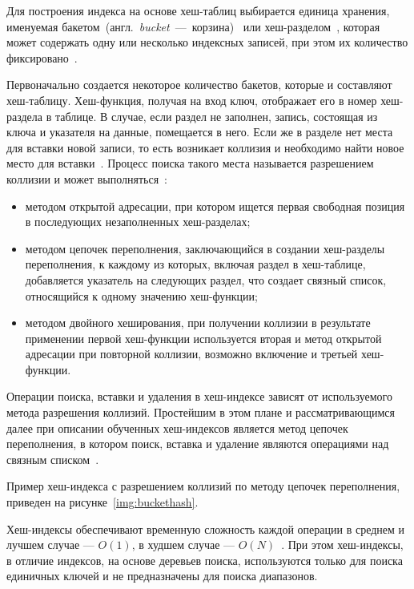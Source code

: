 Для построения индекса на основе хеш-таблиц выбирается единица хранения,
именуемая
\mbox{бакетом}~(англ.~\textit{bucket}~---~\mbox{корзина})~\cite{marvel} или
\mbox{хеш-разделом}~\cite{amur}, которая может содержать одну или несколько
индексных записей, при этом их количество фиксировано~\cite{ship}.

Первоначально создается некоторое количество бакетов, которые и составляют
хеш-таблицу. Хеш-функция, получая на вход ключ, отображает его в номер
хеш-раздела в таблице. В случае, если раздел не заполнен, запись, состоящая из
ключа и указателя на данные, помещается в него. Если же в разделе нет места для
вставки новой записи, то есть возникает коллизия и необходимо найти новое место
для вставки~\cite{marvel}. Процесс поиска такого места называется разрешением
коллизии и может выполняться~\cite{baw}:

\begin{itemize}
    \item методом открытой адресации, при котором ищется первая свободная
        позиция в последующих незаполненных хеш-разделах;
    \item методом цепочек переполнения, заключающийся в создании хеш-разделы
        переполнения, к каждому из которых, включая раздел в хеш-таблице,
        добавляется указатель на следующих раздел, что создает связный список,
        относящийся к одному значению хеш-функции;
    \item методом двойного хеширования, при получении коллизии в
        результате применении первой хеш-функции используется вторая и метод
        открытой адресации при повторной коллизии, возможно включение и третьей
        хеш-функции.
\end{itemize}

Операции поиска, вставки и удаления в хеш-индексе зависят от используемого
метода разрешения коллизий. Простейшим в этом плане и рассматривающимся далее
при описании обученных хеш-индексов является метод цепочек переполнения, в
котором поиск, вставка и удаление являются операциями над связным
списком~\cite{baw}.

Пример хеш-индекса с разрешением коллизий по методу цепочек переполнения,
приведен на рисунке~\ref{img:buckethash}.


Хеш-индексы обеспечивают временную сложность каждой операции в
среднем и лучшем случае --- $O(1)$, в худшем случае --- $O(N)$~\cite{squares}.
При этом хеш-индексы, в отличие индексов, на основе деревьев поиска,
используются только для поиска единичных ключей и не предназначены для поиска
диапазонов.


